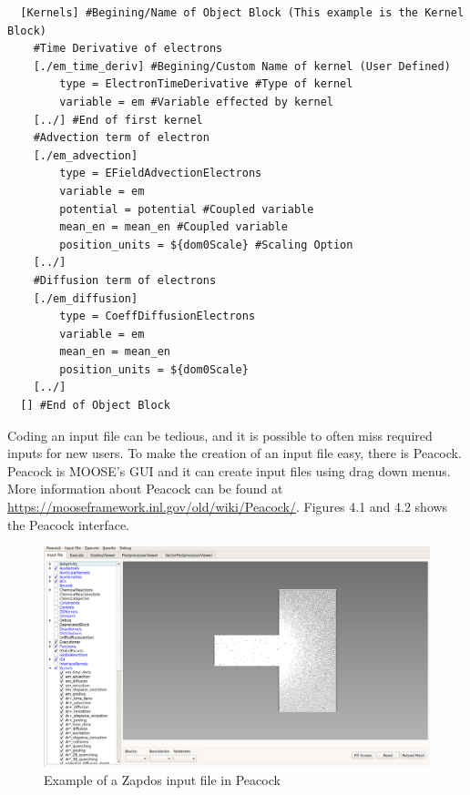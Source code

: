 \documentclass[final]{report}
\begin{document}
  \begin{verbatim}
  [Kernels] #Begining/Name of Object Block (This example is the Kernel Block)
    #Time Derivative of electrons
    [./em_time_deriv] #Begining/Custom Name of kernel (User Defined)
        type = ElectronTimeDerivative #Type of kernel
        variable = em #Variable effected by kernel
    [../] #End of first kernel
    #Advection term of electron
    [./em_advection]
        type = EFieldAdvectionElectrons
        variable = em
        potential = potential #Coupled variable
        mean_en = mean_en #Coupled variable
        position_units = ${dom0Scale} #Scaling Option
    [../]
    #Diffusion term of electrons
    [./em_diffusion]
        type = CoeffDiffusionElectrons
        variable = em
        mean_en = mean_en
        position_units = ${dom0Scale}
    [../]
  [] #End of Object Block
  \end{verbatim}

  Coding an input file can be tedious, and it is possible to often miss required inputs for new users. To make the creation of an input file easy, there is Peacock. Peacock is MOOSE's GUI and it can create input files using drag down menus. More information about Peacock can be found at \\
  \url{https://mooseframework.inl.gov/old/wiki/Peacock/}. Figures 4.1 and 4.2 shows the Peacock interface.


\begin{figure}[h]
  \centering
  \includegraphics[scale=0.35]{zapdos_content/media/Zapdos_Peacock.png}
  \caption{Example of a Zapdos input file in Peacock}
\end{figure}
\end{document}
